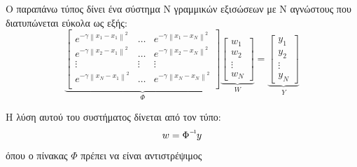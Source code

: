 \documentclass{article}
\newcommand{\norm}[1]{\left\lVert#1\right\rVert}
\newcommand\inv[1]{#1\raisebox{1.15ex}{$\scriptscriptstyle-\!1$}}
\begin{document}
 Ο παραπάνω τύπος δίνει ένα σύστημα Ν γραμμικών εξισώσεων με Ν αγνώστους που διατυπώνεται εύκολα ως εξής:
 \[
 \underbrace{
\begin{bmatrix}
    e^{-\gamma \norm{x_1 - x_1}^2}  & \dots  &  e^{-\gamma \norm{x_1 - x_N}^2} \\
     e^{-\gamma \norm{x_2 - x_1}^2}  & \dots  &  e^{-\gamma \norm{x_2 - x_N}^2} \\
    \vdots  & \vdots & \vdots \\
     e^{-\gamma \norm{x_N - x_1}^2}  & \dots  &  e^{-\gamma \norm{x_N - x_N}^2} \\
\end{bmatrix}}_{  \Phi}
\underbrace{
\begin{bmatrix}
    w_{1}       \\
    w_{2}        \\
    \vdots        \\
    w_{N}
\end{bmatrix}}_{W}
=
\underbrace{
\begin{bmatrix}
    y_{1}       \\
    y_{2}        \\
    \vdots        \\
    y_{N}
\end{bmatrix}}_{Y}
\]

Η λύση αυτού του συστήματος δίνεται από τον τύπο:
$$w=\inv{\Phi} y$$
όπου ο πίνακας $\Phi$ πρέπει να είναι αντιστρέψιμος
\end{document}
